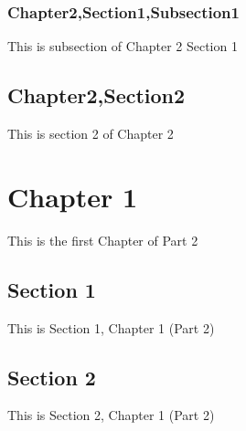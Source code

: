 \documentclass[letterpaper,10pt,english]{sphinxmanual}
\begin{document}
\subsubsection{Chapter2,Section1,Subsection1}
\label{\detokenize{part1/chapter2:chapter2-section1-subsection1}}
This is subsection of Chapter 2 Section 1


\subsection{Chapter2,Section2}
\label{\detokenize{part1/chapter2:chapter2-section2}}
This is section 2 of Chapter 2


\section{Chapter 1}
\label{\detokenize{part2/chapter1:chapter-1}}\label{\detokenize{part2/chapter1::doc}}
This is the first Chapter of Part 2


\subsection{Section 1}
\label{\detokenize{part2/chapter1-section1:section-1}}\label{\detokenize{part2/chapter1-section1::doc}}
This is Section 1, Chapter 1 (Part 2)


\subsection{Section 2}
\label{\detokenize{part2/chapter1-section2:section-2}}\label{\detokenize{part2/chapter1-section2::doc}}
This is Section 2, Chapter 1 (Part 2)







\renewcommand{\indexname}{Index}
\printindex
\end{document}
